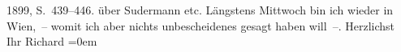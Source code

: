 \begin{ledgroupsized}[t]{13cm}
{{{                        1899, S. 439–446.}}}\label{K_L00913-3h} über Sudermann etc.\pend
           \pstart
           Längstens Mittwoch bin ich wieder in Wien, – womit ich aber nichts unbescheidenes gesagt haben will –.\pend
           \pstart
           Herzlichst {\\[\baselineskip]}Ihr \spacefill\mbox{Richard}\pend
           \leftskip=0em{}
         
         \endnumbering{}\end{ledgroupsized}  \newcommand{\dateiname}{L00913}\newcommand{\titel}{Richard Beer-Hofmann an Arthur Schnitzler, 28. 4. 1899}\newcommand{\editorInnen}{Martin Anton Müller und Gerd-Hermann Susen}
      